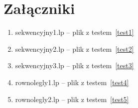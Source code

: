 
\section{Załączniki}

\begin{enumerate}
\item sekwencyjny1.lp -- plik z testem~\ref{test1}
\item sekwencyjny2.lp -- plik z testem~\ref{test2}
\item sekwencyjny3.lp -- plik z testem~\ref{test3}
\item rownolegly1.lp -- plik z testem~\ref{test4}
\item rownolegly2.lp -- plik z testem~\ref{test5}
\end{enumerate}

\newpage
